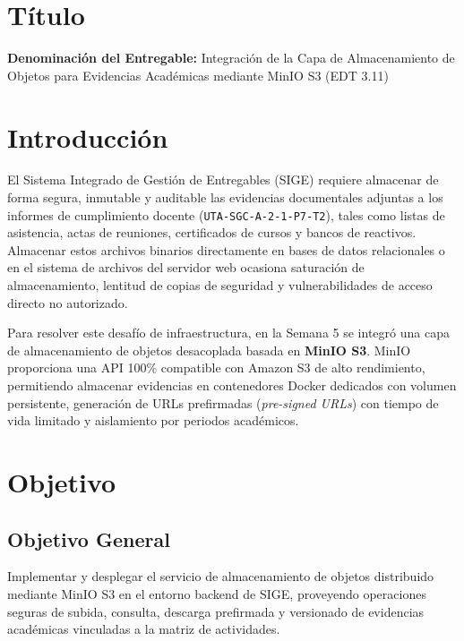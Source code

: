 \documentclass[12pt,a4paper]{article}
\begin{document}
\section{Título}
\textbf{Denominación del Entregable:} Integración de la Capa de Almacenamiento de Objetos para Evidencias Académicas mediante MinIO S3 (EDT 3.11)

\section{Introducción}
El Sistema Integrado de Gestión de Entregables (SIGE) requiere almacenar de forma segura, inmutable y auditable las evidencias documentales adjuntas a los informes de cumplimiento docente (\texttt{UTA-SGC-A-2-1-P7-T2}), tales como listas de asistencia, actas de reuniones, certificados de cursos y bancos de reactivos. Almacenar estos archivos binarios directamente en bases de datos relacionales o en el sistema de archivos del servidor web ocasiona saturación de almacenamiento, lentitud de copias de seguridad y vulnerabilidades de acceso directo no autorizado.

Para resolver este desafío de infraestructura, en la Semana 5 se integró una capa de almacenamiento de objetos desacoplada basada en \textbf{MinIO S3}. MinIO proporciona una API 100\% compatible con Amazon S3 de alto rendimiento, permitiendo almacenar evidencias en contenedores Docker dedicados con volumen persistente, generación de URLs prefirmadas (\textit{pre-signed URLs}) con tiempo de vida limitado y aislamiento por periodos académicos.

\section{Objetivo}

\subsection{Objetivo General}
Implementar y desplegar el servicio de almacenamiento de objetos distribuido mediante MinIO S3 en el entorno backend de SIGE, proveyendo operaciones seguras de subida, consulta, descarga prefirmada y versionado de evidencias académicas vinculadas a la matriz de actividades.
\end{document}
